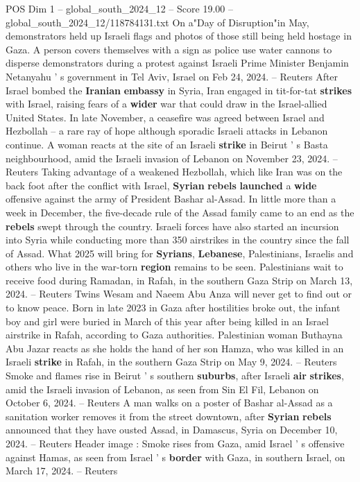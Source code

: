 \begin{textsample}{POS Dim 1 – global\_south\_2024\_12 – Score 19.00 – global\_south\_2024\_12/118784131.txt}
On a"Day of Disruption"in May, demonstrators held up Israeli flags and photos of those still being held hostage in Gaza.
A person covers themselves with a sign as police use water cannons to disperse demonstrators during a protest against Israeli Prime Minister Benjamin Netanyahu ' s government in Tel Aviv, Israel on Feb 24, 2024. -- Reuters After Israel bombed the \textbf{Iranian} \textbf{embassy} in Syria, Iran engaged in tit-for-tat \textbf{strikes} with Israel, raising fears of a \textbf{wider} war that could draw in the Israel-allied United States.
In late November, a ceasefire was agreed between Israel and Hezbollah -- a rare ray of hope although sporadic Israeli attacks in Lebanon continue.
A woman reacts at the site of an Israeli \textbf{strike} in Beirut ' s Basta neighbourhood, amid the Israeli invasion of Lebanon on November 23, 2024. -- Reuters Taking advantage of a weakened Hezbollah, which like Iran was on the back foot after the conflict with Israel, \textbf{Syrian} \textbf{rebels} \textbf{launched} a \textbf{wide} offensive against the army of President Bashar al-Assad.
In little more than a week in December, the five-decade rule of the Assad family came to an end as the \textbf{rebels} swept through the country.
Israeli forces have also started an incursion into Syria while conducting more than 350 airstrikes in the country since the fall of Assad.
What 2025 will bring for \textbf{Syrians}, \textbf{Lebanese}, Palestinians, Israelis and others who live in the war-torn \textbf{region} remains to be seen.
Palestinians wait to receive food during Ramadan, in Rafah, in the southern Gaza Strip on March 13, 2024. -- Reuters Twins Wesam and Naeem Abu Anza will never get to find out or to know peace.
Born in late 2023 in Gaza after hostilities broke out, the infant boy and girl were buried in March of this year after being killed in an Israel airstrike in Rafah, according to Gaza authorities.
Palestinian woman Buthayna Abu Jazar reacts as she holds the hand of her son Hamza, who was killed in an Israeli \textbf{strike} in Rafah, in the southern Gaza Strip on May 9, 2024. -- Reuters Smoke and flames rise in Beirut ' s southern \textbf{suburbs}, after Israeli \textbf{air} \textbf{strikes}, amid the Israeli invasion of Lebanon, as seen from Sin El Fil, Lebanon on October 6, 2024. -- Reuters A man walks on a poster of Bashar al-Assad as a sanitation worker removes it from the street downtown, after \textbf{Syrian} \textbf{rebels} announced that they have ousted Assad, in Damascus, Syria on December 10, 2024. -- Reuters Header image : Smoke rises from Gaza, amid Israel ' s offensive against Hamas, as seen from Israel ' s \textbf{border} with Gaza, in southern Israel, on March 17, 2024. -- Reuters

\end{textsample}
